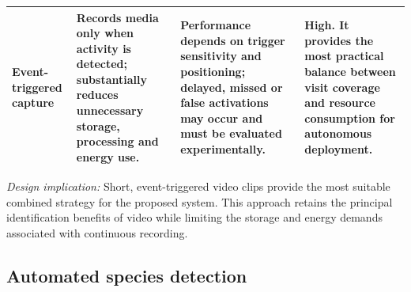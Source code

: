 \begin{table}[htbp]
\begin{tabularx}{\textwidth}{
        >{\raggedright\arraybackslash}p{}
        >{\raggedright\arraybackslash}X
        >{\raggedright\arraybackslash}X
        >{\raggedright\arraybackslash}p{}
    }
        \addlinespace

        Event-triggered capture
        & Records media only when activity is detected; substantially reduces unnecessary storage, processing and energy use.
        & Performance depends on trigger sensitivity and positioning; delayed, missed or false activations may occur and must be evaluated experimentally.
        & \textbf{High.} It provides the most practical balance between visit coverage and resource consumption for autonomous deployment. \\

        \bottomrule
    \end{tabularx}

    \vspace{0.5em}

    \begin{minipage}{0.96\textwidth}
        \footnotesize
        \textit{Design implication:} Short, event-triggered video clips provide
        the most suitable combined strategy for the proposed system. This
        approach retains the principal identification benefits of video while
        limiting the storage and energy demands associated with continuous
        recording.
    \end{minipage}
\end{table}

\subsection{Automated species detection}


